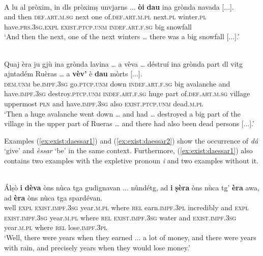 \ea
\label{ex:exist.da5}
\\
\gll    A lu al pròxim, in dls pròximṣ unvjarns ... \textbf{òi} \textbf{dau} ina grònda navada [...].\\
and then \textsc{def.art.m.sg} next one of.\textsc{def.art.m.pl} next.\textsc{pl} winter.\textsc{pl} {} have.\textsc{prs.3sg}.\textsc{expl} \textsc{exist.ptcp.unm} \textsc{indef.art.f.sg} big snowfall \\
\glt `And then the next, one of the next winters … there was a big snowfall [...].'
\z

\ea
\label{ex:exist.da6}
\\
\gll    Quaj èra ju gjù ina grònda lavina … a vèva … déstruí ina grònda part dl vitg ajntadém Ruèras … a \textbf{vèv’} è \textbf{dau} mòrts [...].\\
\textsc{dem.unm} be.\textsc{impf.3sg} go.\textsc{ptcp.unm} down \textsc{indef.art.f.sg} big avalanche {} and have.\textsc{impf.3sg} {} destroy.\textsc{ptcp.unm} \textsc{indef.art.f.sg} huge part of.\textsc{def.art.m.sg} village uppermost \textsc{pln} {} and have.\textsc{impf.3sg} also \textsc{exist.ptcp.unm} dead.\textsc{m.pl}\\
\glt `Then a huge avalanche went down … and had … destroyed a big part of the village in the upper part of Rueras … and there had also been dead persons [...].'
\z

Examples (\ref{ex:exist:daessar1}) and (\ref{ex:exist:daessar2}) show the occurrence of \textit{dá} `give' and \textit{èssar} `be' in the same context. Furthermore, (\ref{ex:exist:daessar1}) also contains two examples with the expletive pronoun \textit{i} and two examples without it.

\ea
\label{ex:exist:daessar1}
\\
\gll Álṣò \textbf{i} \textbf{dèva} òns nùca tga gudignavan ... nùndétg, ad \textbf{i} \textbf{ṣèra} òns nùca tg’ \textbf{èra} awa, ad \textbf{èra} òns nùca tga spardévan.\\
well \textsc{expl} \textsc{exist.impf.3sg} year.\textsc{m.pl} where \textsc{rel} earn.\textsc{impf.3pl} {} incredibly and \textsc{expl} \textsc{exist.impf.3sg} year.\textsc{m.pl} where \textsc{rel} \textsc{exist.impf.3sg} water and \textsc{exist.impf.3sg} year.\textsc{m.pl} where \textsc{rel} lose.\textsc{impf.3pl} \\
\glt `Well, there were years when they earned ... a lot of money, and there were years with rain, and precisely years when they would lose money.'
\z

